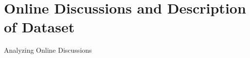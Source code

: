 \documentclass{beamer}
\begin{document}
\section{Online Discussions and Description of Dataset}

\begin{frame}{Analyzing Online Discussions}
\begin{figure}
\end{figure}
\end{frame}
\end{document}
